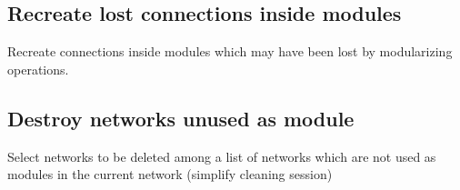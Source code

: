 \subsection{Recreate lost connections inside modules}
Recreate connections inside modules which may have been lost by modularizing operations.
\subsection{Destroy networks unused as module}
Select networks to be deleted among a list of networks which are not used as modules in the current network (simplify cleaning session)